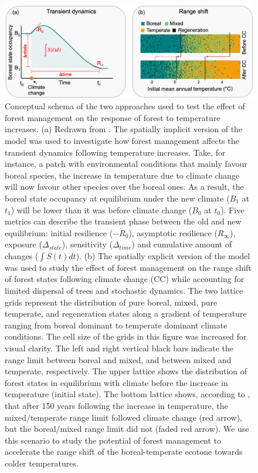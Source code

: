 \hypertarget{fig:concept}{%
\begin{figure}
\centering
\includegraphics{manuscript/img/concept.png}
\caption[{Conceptual schema of the two approaches used to test the
effect of forest management on the response of forest to temperature
increases.}]{Conceptual schema of the two approaches used to test the
effect of forest management on the response of forest to temperature
increases. (a) Redrawn from \citet{Boulangeat2018}. The spatially
implicit version of the model was used to investigate how forest
management affects the transient dynamics following temperature
increases. Take, for instance, a patch with environmental conditions
that mainly favour boreal species, the increase in temperature due to
climate change will now favour other species over the boreal ones. As a
result, the boreal state occupancy at equilibrium under the new climate
(\(B_1\) at \(t_1\)) will be lower than it was before climate change
(\(B_0\) at \(t_0\)). Five metrics can describe the transient phase
between the old and new equilibrium: initial resilience (\(-R_0\)),
asymptotic resilience (\(R_{\infty}\)), exposure (\(\Delta_{state}\)),
sensitivity (\(\Delta_{time}\)) and cumulative amount of changes
(\(\int S(t)dt\)). (b) The spatially explicit version of the model was
used to study the effect of forest management on the range shift of
forest states following climate change (CC) while accounting for limited
dispersal of trees and stochastic dynamics. The two lattice grids
represent the distribution of pure boreal, mixed, pure temperate, and
regeneration states along a gradient of temperature ranging from boreal
dominant to temperate dominant climate conditions. The cell size of the
grids in this figure was increased for visual clarity. The left and
right vertical black bars indicate the range limit between boreal and
mixed, and between mixed and temperate, respectively. The upper lattice
shows the distribution of forest states in equilibrium with climate
before the increase in temperature (initial state). The bottom lattice
shows, according to \citet{Vissault2020}, that after 150 years following
the increase in temperature, the mixed/temperate range limit followed
climate change (red arrow), but the boreal/mixed range limit did not
(faded red arrow). We use this scenario to study the potential of forest
management to accelerate the range shift of the boreal-temperate ecotone
towards colder temperatures.}
\label{fig:concept}
\end{figure}
}

